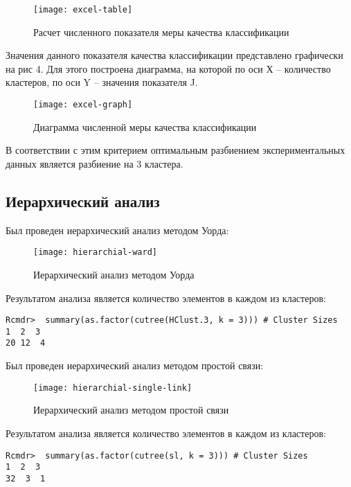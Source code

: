 \documentclass[a4paper,14pt]{extarticle}
\begin{document}
\begin{figure}[H]
    \centering
    \texttt{[image: excel-table]}
    \caption{Расчет численного показателя меры качества классификации}
    \label{fig:excel-table}
\end{figure}

Значения данного показателя качества классификации представлено графически на
рис 4.  Для этого построена диаграмма, на которой по оси Х – количество
кластеров, по оси Y – значения показателя J.

\begin{figure}[H]
    \centering
    \texttt{[image: excel-graph]}
    \caption{Диаграмма численной меры качества классификации}
    \label{fig:excel-graph}
\end{figure}

В соответствии с этим критерием оптимальным разбиением экспериментальных данных
является разбиение на 3 кластера.

\subsection{Иерархический анализ}
Был проведен иерархический анализ методом Уорда:

\begin{figure}[H]
    \centering
    \texttt{[image: hierarchial-ward]}
    \caption{Иерархический анализ методом Уорда}
    \label{fig:hierarchial-ward}
\end{figure}

Результатом анализа является количество элементов в каждом из кластеров:

\begin{lstlisting}
Rcmdr>  summary(as.factor(cutree(HClust.3, k = 3))) # Cluster Sizes
1  2  3
20 12  4
\end{lstlisting}

Был проведен иерархический анализ методом простой связи:

\begin{figure}[H]
    \centering
    \texttt{[image: hierarchial-single-link]}
    \caption{Иерархический анализ методом простой связи}
    \label{fig:hierarchial-single-link}
\end{figure}

Результатом анализа является количество элементов в каждом из кластеров:

\begin{lstlisting}
Rcmdr>  summary(as.factor(cutree(sl, k = 3))) # Cluster Sizes
1  2  3
32  3  1
\end{lstlisting}
\end{document}
